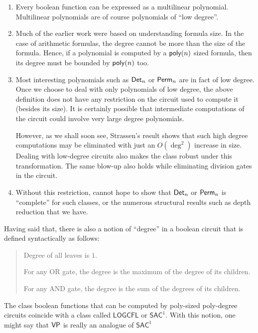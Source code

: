 \begin{enumerate}

\item Every boolean function can be expressed as a multilinear polynomial. Multilinear polynomials are of course polynomials of ``low degree''. 

\item Much of the earlier work were based on understanding formula size. In the case of arithmetic formulas, the degree cannot be more than the size of the formula. Hence, if a polynomial is computed by a $\mathsf{poly}(n)$ sized formula, then its degree must be bounded by $\mathsf{poly}(n)$ too. 

\item Most interesting polynomials such as $\mathsf{Det}_n$ or $\mathsf{Perm}_n$ are in fact of low degree. Once we choose to deal with only polynomials of low degree, the above definition does not have any restriction on the circuit used to compute it (besides its size). It is certainly possible that intermediate computations of the circuit could involve very large degree polynomials. 

However, as we shall soon see, Strassen's result shows that such high degree computations may be eliminated with just an $O(\deg^2)$ increase in size. Dealing with low-degree circuits also makes the class robust under this transformation. The same blow-up also holds while eliminating division gates in the circuit. 

\item Without this restriction, cannot hope to show that $\mathsf{Det}_n$ or $\mathsf{Perm}_n$ is ``complete'' for such classes, or the numerous structural results such as depth reduction that we have. 

\end{enumerate}

Having said that, there is also a notion of ``degree'' in a boolean circuit that is defined syntactically as follows:
 \begin{quote}
   Degree of all leaves is $1$. 

   For any OR gate, the degree is the maximum of the degree of its children. 

   For any AND gate, the degree is the sum of the degrees of its children. 
 \end{quote}
The class boolean functions that can be computed by poly-sized poly-degree circuits coincide with a class called $\mathsf{LOGCFL}$ or $\mathsf{SAC}^1$. With this notion, one might say that $\mathsf{VP}$ is really an analogue of $\mathsf{SAC}^1$\\


